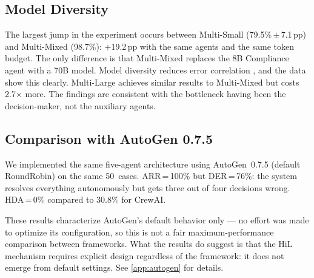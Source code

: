 \documentclass[preprint,12pt,numrefs]{elsarticle}
\begin{document}
\subsection{Model Diversity}
\begin{table}[H]
\centering
\caption{Model diversity configurations with 5~agents.}
\label{tab:diversidad}
\end{table}
The largest jump in the experiment occurs between Multi-Small
(79.5\%\,$\pm$\,7.1\,pp) and Multi-Mixed (98.7\%): +19.2\,pp with the
same agents and the same token budget. The only difference is that
Multi-Mixed replaces the 8B Compliance agent with a 70B model. Model
diversity reduces error correlation
\citep{dietterich2000ensemble,Gomes2017ensemble}, and the data show
this clearly. Multi-Large achieves similar results to Multi-Mixed but
costs 2.7$\times$ more. The findings are consistent with the bottleneck
having been the decision-maker, not the auxiliary agents.

\subsection{Comparison with AutoGen 0.7.5}

We implemented the same five-agent architecture using AutoGen~0.7.5
\citep{wu2023autogen} (default RoundRobin) on the same 50~cases.
ARR\,=\,100\% but DER\,=\,76\%: the system resolves everything
autonomously but gets three out of four decisions wrong. HDA\,=\,0\%
compared to 30.8\% for CrewAI.

These results characterize AutoGen's default behavior only --- 
no effort was made to optimize its configuration, so this 
is not a fair maximum-performance comparison between frameworks. 
What the results do suggest is that the HiL mechanism requires 
explicit design regardless of the framework: it does not emerge 
from default settings. See \ref{app:autogen} for details.
\end{document}

